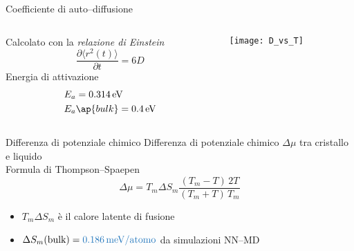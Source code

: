 \documentclass{beamer}
\begin{document}
\begin{frame}{Coefficiente di auto--diffusione}
 \begin{columns}
  \begin{column}{0.5\textwidth}
   Calcolato con la \emph{relazione di Einstein}
   \begin{equation*}
    \frac{\partial\langle r^2(t)\rangle}{\partial t}=6D
   \end{equation*}
   Energia di attivazione
   \begin{equation*}
    \begin{split}
        &E_a = \SI{0.314}{eV}\\
	&E_a\ap{bulk} = \SI{0.4}{eV}
    \end{split}
   \end{equation*}
  \end{column}
  \begin{column}{0.5\textwidth}
  \centering
   \texttt{[image: D\_vs\_T]}
   \begin{table}[h]
   \begin{center}
    \end{center}
  \end{table}
  \end{column}


 \end{columns}

\end{frame}


\begin{frame}{Differenza di potenziale chimico}
 Differenza di potenziale chimico $\Delta\mu$ tra cristallo e liquido\\[3pt]
 Formula di {\ev Thompson--Spaepen}
 \[ \Delta\mu = T_m\Delta S_m \frac{(T_m-T)\,2T}{(T_m+T)\,T_m} \]
 \begin{itemize}
 \item $T_m\Delta S_m$ è il calore latente di fusione
 \item $\Delta S_m (\text{bulk})=\textcolor{themecolor}{\num{0.186}\,\si{meV/\text{atomo}}}$ da simulazioni NN--MD
 \end{itemize}
 
\end{frame}
\end{document}
